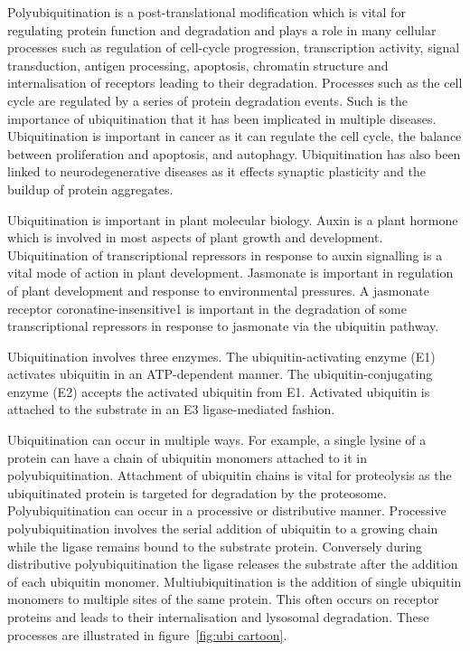 \documentclass[11pt]{article}
\begin{document}
Polyubiquitination is a post-translational modification which is vital for regulating protein function and degradation and plays a role in many cellular processes such as regulation of cell-cycle progression, transcription activity, signal transduction, antigen processing, apoptosis, chromatin structure and internalisation of receptors leading to their degradation\cite{hershko1998ubiquitin}. Processes such as the cell cycle are regulated by a series of protein degradation events\cite{bastians1999cell,glotzer1991cyclin}. Such is the importance of ubiquitination that it has been implicated in multiple diseases. Ubiquitination is important in cancer as it can regulate the cell cycle, the balance between proliferation and apoptosis, and autophagy\cite{kirkin2011ubiquitin}. Ubiquitination has also been linked to neurodegenerative diseases as it effects synaptic plasticity and the buildup of protein aggregates\cite{tai2008ubiquitin}.

Ubiquitination is important in plant molecular biology. Auxin is a plant hormone which is involved in most aspects of plant growth and development\cite{stewart2010trees}. Ubiquitination of transcriptional repressors in response to auxin signalling is a vital mode of action in plant development\cite{kelley2012ubiquitin}. Jasmonate is important in regulation of plant development and response to environmental pressures\cite{kombrink2012chemical}. A jasmonate receptor coronatine-insensitive1 is important in the degradation of some transcriptional repressors in response to jasmonate\cite{sheard2010jasmonate} via the ubiquitin pathway.

Ubiquitination involves three enzymes. The ubiquitin-activating enzyme (E1) activates ubiquitin in an ATP-dependent manner. The ubiquitin-conjugating enzyme (E2) accepts the activated ubiquitin from E1. Activated ubiquitin is attached to the substrate in an E3 ligase-mediated fashion\cite{hershko1983components}. 

Ubiquitination can occur in multiple ways. For example, a single lysine of a protein can have a chain of ubiquitin monomers attached to it in polyubiquitination. Attachment of ubiquitin chains is vital for proteolysis as the ubiquitinated protein is targeted for degradation by the proteosome\cite{finley1994inhibition,ciechanover1984ubiquitin,emmerich2011emerging}. Polyubiquitination can occur in a processive or distributive manner\cite{rape2006processivity}. Processive polyubiquitination involves the serial addition of ubiquitin to a growing chain while the ligase remains bound to the substrate protein. Conversely during distributive polyubiquitination the ligase releases the substrate after the addition of each ubiquitin monomer. Multiubiquitination is the addition of single ubiquitin monomers to multiple sites of the same protein. This often occurs on receptor proteins and leads to their internalisation and lysosomal degradation\cite{monami2008grb10,staub2006role,mosesson2003endocytosis,haglund2003multiple}. These processes are illustrated in figure~\ref{fig:ubi cartoon}.
\end{document}
